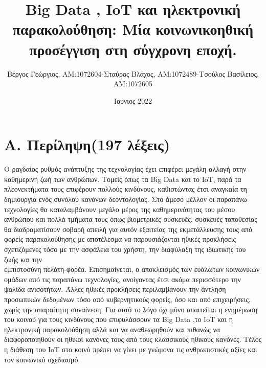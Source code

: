 \documentclass{article}
\title{Big Data , IoT και ηλεκτρονική παρακολούθηση: Μία κοινωνικοηθική προσέγγιση στη σύγχρονη εποχή.}
\author{Βέργος Γεώργιος, AM:1072604-Σταύρος Βλάχος, AM:1072489-Τσούλος Βασίλειος,\\AM:1072605}
\date{Ιούνιος 2022}
\begin{document}
\maketitle
\tableofcontents
\newpage
\section*{A. Περίληψη(197 λέξεις)}
Ο ραγδαίος ρυθμός ανάπτυξης της τεχνολογίας έχει επιφέρει μεγάλη αλλαγή στην καθημερινή ζωή των ανθρώπων. Τομείς όπως τα Big Data και το IoT, παρά τα πλεονεκτήματα τους επιφέρουν πολλούς κινδύνους, καθιστώντας έτσι αναγκαία τη δημιουργία ενός συνόλου κανόνων δεοντολογίας. Στο άμεσο μέλλον οι παραπάνω τεχνολογίες θα καταλαμβάνουν  μεγάλο μέρος της καθημερινότητας  του μέσου ανθρώπου και πολλά τμήματα τους όπως βιομετρικές συσκευές, συσκευές τοποθεσίας θα διαδραματίσουν σοβαρή απειλή για αυτόν εξαιτείας της εκμετάλλευσης τους από φορείς παρακολούθησης με αποτέλεσμα να παρουσιάζονται ηθικές  προκλήσεις σχετιζόμενες τόσο με την ασφάλεια του χρήστη, την διαφύλαξη της ιδιωτικής του ζωής  και την\\εμπιστοσύνη πελάτη-φορέα. Επισημαίνεται, ο αποκλεισμός των ευάλωτων κοινωνικών ομάδων από τις παραπάνω τεχνολογίες, ανοίγοντας έτσι ακόμα περισσότερο την ψαλίδα ανισοτήτων. Άλλες ηθικές προκλήσεις περιλαμβάνουν την άντληση προσωπικών δεδομένων τόσο από κυβερνητικούς φορείς, όσο και από επιχειρήσεις, χωρίς την απαραίτητη συναίνεση. Για αυτό το λόγο όχι μόνο απαιτείται η ενημέρωση του κοινού για τους κινδύνους που επιφυλάσσουν  τα Big Data ,το IoT και η ηλεκτρονική παρακολούθηση αλλά και  να αναθεωρηθούν  και πιθανώς να διαφοροποιηθούν οι ηθικοί κανόνες τους από τους κλασσικούς ηθικούς κανόνες. Τέλος η διάθεση του IoT στο κοινό πρέπει να γίνει με γνώμονα τις ανθρωπιστικές αξίες και τον κοινωνικό σχεδιασμό.\newline
\end{document}
